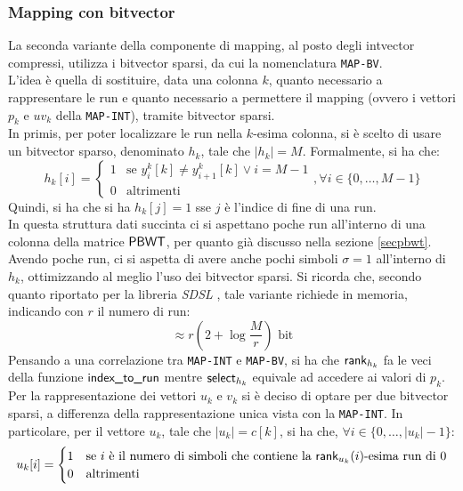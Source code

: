 \subsubsection{Mapping con bitvector}
La seconda variante della componente di mapping, al posto degli
intvector compressi, utilizza i bitvector sparsi, da cui la nomenclatura
\texttt{MAP-BV}.\\
L'idea è quella di sostituire, data una colonna $k$, quanto necessario a
rappresentare le run e quanto
necessario a permettere il mapping (ovvero i vettori $p_k$ e $uv_k$ della
\texttt{MAP-INT}), tramite bitvector sparsi.\\ 
In primis, per poter localizzare le run nella $k$-esima colonna, si è scelto di
usare un bitvector sparso, denominato $h_k$, tale
che $|h_k|=M$. Formalmente, si ha che:
\begin{equation}
  \label{eq:bv1}
  h_k[i]=
  \begin{cases}
    1&\mbox{se } y^k_{i}[k]\neq y^k_{i+1}[k]\lor i=M-1\\
    0&\mbox{altrimenti}
  \end{cases},\forall i\in \{0,\ldots,M-1\}
\end{equation}
Quindi, si ha che si ha $h_k[j]=1$ sse $j$ è l'indice di fine di
una run.\\
In questa struttura dati succinta ci si
aspettano poche run all'interno di una colonna della 
matrice $\mbox{\rm {\sf PBWT}}$, per quanto già discusso nella sezione
\ref{secpbwt}. Avendo poche run, ci si aspetta di avere anche pochi simboli
$\sigma=1$ 
all'interno di 
$h_k$, ottimizzando al meglio l'uso dei bitvector sparsi.
Si ricorda che, secondo quanto
riportato per la libreria \textit{SDSL} \cite{sdsl}, tale variante richiede in
memoria, indicando con $r$ il numero di run:
\begin{equation}
  \label{eq:bv2}
  \approx r\left(2+\log\frac{M}{r}\right)\mbox{ bit}
\end{equation}
Pensando a una correlazione tra \texttt{MAP-INT} e \texttt{MAP-BV}, si ha che
$\mbox{\rm {\sf rank}}_{h_k}$ fa le veci della funzione $\mbox{\rm {\sf index\_to\_run}}$ mentre
$\mbox{\rm {\sf select}}_{h_k}$ equivale ad accedere ai valori di $p_k$.\\
Per la rappresentazione dei vettori $u_k$ e $v_k$ si
è deciso di optare per due bitvector sparsi, a differenza della rappresentazione
unica vista con la 
\texttt{MAP-INT}. In particolare,
per il vettore $u_k$, tale che $|u_k|=c[k]$, si ha che, $\forall
i\in\{0,\ldots,|u_k|-1\}$: 
\begin{equation}
  \label{eq:bv3}
  u_k[i]=
  \begin{cases}
    1&\mbox{se }i \mbox{ è il numero di simboli che contiene la
    }\mbox{\rm {\sf rank}}_{u_k}(i)\mbox{-esima run di 0}\\
    0&\mbox{altrimenti}
  \end{cases}
\end{equation}
